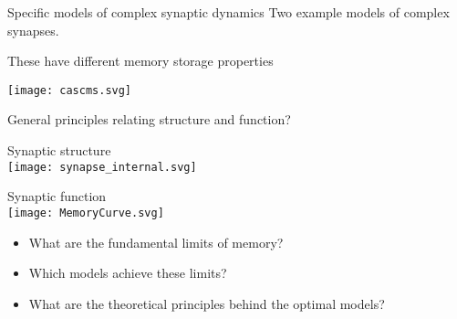 \documentclass[final]{beamer}%
\begin{document}

\begin{frame}{Specific models of complex synaptic dynamics}
%
 Two example models of complex synapses.
 \begin{center}
  \hspace{2cm}
 \end{center}

 These have different memory storage properties
 \begin{center}
   \texttt{[image: cascms.svg]}
 \end{center}
%
\end{frame}


\begin{frame}{General principles relating structure and function?}
%
 \vspace{-2\baselineskip}
 \begin{center}
 \parbox[t]{0.35\linewidth}{%
 \begin{center}
   Synaptic structure\\
   \texttt{[image: synapse\_internal.svg]}
 \end{center}
 }
 \hspace{0.1\linewidth}
 \parbox[t]{0.3\linewidth}{%
 \begin{center}
   Synaptic function\\
   \texttt{[image: MemoryCurve.svg]}
 \end{center}
 }
 \end{center}
 \begin{itemize}
   \item What are the fundamental limits of memory?
   \vp\item Which models achieve these limits?
   \vp\item What are the theoretical principles behind the optimal models?
 \end{itemize}
%
\end{frame}
\end{document}
